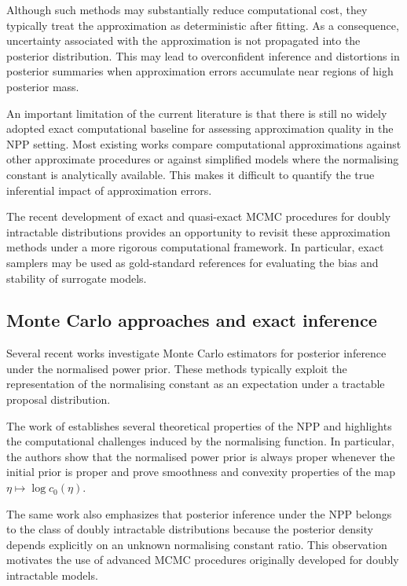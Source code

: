 Although such methods may substantially reduce computational cost, they typically treat the approximation as deterministic after fitting.
As a consequence, uncertainty associated with the approximation is not propagated into the posterior distribution.
This may lead to overconfident inference and distortions in posterior summaries when approximation errors accumulate near regions of high posterior mass.

An important limitation of the current literature is that there is still no widely adopted exact computational baseline for assessing approximation quality in the NPP setting.
Most existing works compare computational approximations against other approximate procedures or against simplified models where the normalising constant is analytically available.
This makes it difficult to quantify the true inferential impact of approximation errors.

The recent development of exact and quasi-exact MCMC procedures for doubly intractable distributions provides an opportunity to revisit these approximation methods under a more rigorous computational framework.
In particular, exact samplers may be used as gold-standard references for evaluating the bias and stability of surrogate models.

\subsection{Monte Carlo approaches and exact inference}

Several recent works investigate Monte Carlo estimators for posterior inference under the normalised power prior.
These methods typically exploit the representation of the normalising constant as an expectation under a tractable proposal distribution.

The work of  establishes several theoretical properties of the NPP and highlights the computational challenges induced by the normalising function.
In particular, the authors show that the normalised power prior is always proper whenever the initial prior is proper and prove smoothness and convexity properties of the map $\eta \mapsto \log c_0(\eta)$.

The same work also emphasizes that posterior inference under the NPP belongs to the class of doubly intractable distributions because the posterior density depends explicitly on an unknown normalising constant ratio.
This observation motivates the use of advanced MCMC procedures originally developed for doubly intractable models.

